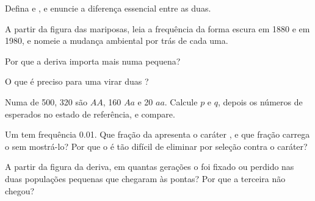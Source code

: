 \begin{exercise}[$\star$]\label{exo:g12:selection-drift-speciation:2}
Defina  e , e enuncie a diferença
essencial entre as duas.
\end{exercise}

\begin{exercise}[$\star$]\label{exo:g12:selection-drift-speciation:3}
A partir da figura das mariposas, leia a frequência da forma escura em
1880 e em 1980, e nomeie a mudança ambiental por trás de cada uma.
\end{exercise}

\begin{exercise}[$\star$]\label{exo:g12:selection-drift-speciation:4}
Por que a deriva importa mais numa  pequena?
\end{exercise}

\begin{exercise}[$\star$]\label{exo:g12:selection-drift-speciation:5}
O que é preciso para uma  virar duas ?
\end{exercise}

\begin{exercise}[$\star\star$]\label{exo:g12:selection-drift-speciation:6}
Numa  de 500, 320 são $AA$, 160 $Aa$ e 20 $aa$. Calcule $p$ e
$q$, depois os números de  esperados no estado de referência,
e compare.
\end{exercise}

\begin{exercise}[$\star\star$]\label{exo:g12:selection-drift-speciation:7}
Um   tem frequência 0.01. Que fração da 
apresenta o caráter , e que fração carrega o  sem
mostrá-lo? Por que o  é tão difícil de eliminar por seleção contra
o caráter?
\end{exercise}

\begin{exercise}[$\star\star$]\label{exo:g12:selection-drift-speciation:8}
A partir da figura da deriva, em quantas gerações o  foi fixado ou
perdido nas duas populações pequenas que chegaram às pontas? Por que a
terceira não chegou?
\end{exercise}

